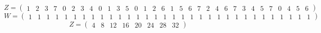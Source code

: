 \documentclass{article}
\begin{document}
$$
 Z =\left(
\begin{array}{cccccccccccccccccccccccccccccccc}
1 \!&\! 2 \!&\! 3 \!&\! 7 \!&\! 0 \!&\! 2 \!&\! 3 \!&\! 4 \!&\! 0 \!&\! 1 \!&\! 3 \!&\! 5 \!&\! 0 \!&\! 1 \!&\! 2 \!&\! 6 \!&\! 1 \!&\! 5 \!&\! 6 \!&\! 7 \!&\! 2 \!&\! 4 \!&\! 6 \!&\! 7 \!&\! 3 \!&\! 4 \!&\! 5 \!&\! 7 \!&\! 0 \!&\! 4 \!&\! 5 \!&\! 6 
\end{array}
\right)$$
$$
 W =\left(
\begin{array}{cccccccccccccccccccccccccccccccc}
1 \!&\! 1 \!&\! 1 \!&\! 1 \!&\! 1 \!&\! 1 \!&\! 1 \!&\! 1 \!&\! 1 \!&\! 1 \!&\! 1 \!&\! 1 \!&\! 1 \!&\! 1 \!&\! 1 \!&\! 1 \!&\! 1 \!&\! 1 \!&\! 1 \!&\! 1 \!&\! 1 \!&\! 1 \!&\! 1 \!&\! 1 \!&\! 1 \!&\! 1 \!&\! 1 \!&\! 1 \!&\! 1 \!&\! 1 \!&\! 1 \!&\! 1 
\end{array}
\right)$$
$$
 Z =\left(
\begin{array}{cccccccc}
4 \!&\! 8 \!&\! 12 \!&\! 16 \!&\! 20 \!&\! 24 \!&\! 28 \!&\! 32 
\end{array}
\right)$$
\end{document}
